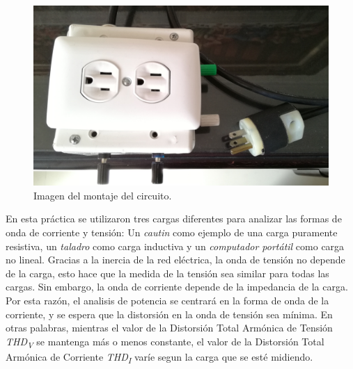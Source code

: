 \documentclass[journal]{IEEEtran}
\begin{document}
\begin{figure}[h]
\centering
\includegraphics[clip,width=\columnwidth]{circuit_box.png}
\caption{Imagen del montaje del circuito.}
\label{circuit_box}
\end{figure}

En esta práctica se utilizaron tres cargas diferentes 
para analizar las formas de onda de corriente y tensión: 
Un \textit{cautin} como ejemplo de una carga puramente 
resistiva, un \textit{taladro} como carga inductiva y un 
\textit{computador portátil} como carga no lineal. 
Gracias a la inercia de la red eléctrica, la onda de 
tensión no depende de la carga, esto hace que la medida de 
la tensión sea similar para todas las cargas. Sin embargo, 
la onda de corriente depende de la impedancia de la carga. 
Por esta razón, el analisis de potencia se centrará 
en la forma de onda de la corriente, y se espera que 
la distorsión en la onda de tensión sea mínima. En otras 
palabras, mientras el valor de la Distorsión Total Armónica
de Tensión \textit{THD\textsubscript{V}} se mantenga más o
menos constante, el valor de la Distorsión Total Armónica
de Corriente \textit{THD\textsubscript{I}} varíe segun 
la carga que se esté midiendo.  \\

\end{document}

